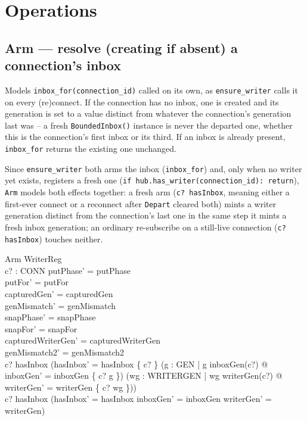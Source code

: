 \documentclass[a4paper,10pt,fleqn]{article}
\begin{document}
\section{Operations}

\subsection{Arm --- resolve (creating if absent) a connection's inbox}

Models \texttt{inbox\_for(connection\_id)} called on its own, as
\texttt{ensure\_writer} calls it on every (re)connect. If the connection has
no inbox, one is created and its generation is set to a value distinct from
whatever the connection's generation last was -- a fresh
\texttt{BoundedInbox()} instance is never the departed one, whether this is
the connection's first inbox or its third. If an inbox is already present,
\texttt{inbox\_for} returns the existing one unchanged.

Since \texttt{ensure\_writer} both arms the inbox (\texttt{inbox\_for}) and,
only when no writer yet exists, registers a fresh one
(\texttt{if hub.has\_writer(connection\_id): return}), \texttt{Arm} models
both effects together: a fresh arm (\texttt{c? \notin hasInbox}, meaning
either a first-ever connect or a reconnect after \texttt{Depart} cleared
both) mints a writer generation distinct from the connection's last one in
the same step it mints a fresh inbox generation; an ordinary re-subscribe on
a still-live connection (\texttt{c? \in hasInbox}) touches neither.

\begin{schema}{Arm}
  \Delta WriterReg \\
  c? : CONN
\where
  putPhase' = putPhase \\
  putFor' = putFor \\
  capturedGen' = capturedGen \\
  genMismatch' = genMismatch \\
  snapPhase' = snapPhase \\
  snapFor' = snapFor \\
  capturedWriterGen' = capturedWriterGen \\
  genMismatch2' = genMismatch2 \\
  c? \notin hasInbox \implies
    (hasInbox' = hasInbox \cup \{ c? \} \land
     (\exists g : GEN | g \neq inboxGen(c?) @
       inboxGen' = inboxGen \oplus \{ c? \mapsto g \}) \land
     (\exists wg : WRITERGEN | wg \neq writerGen(c?) @
       writerGen' = writerGen \oplus \{ c? \mapsto wg \})) \\
  c? \in hasInbox \implies
    (hasInbox' = hasInbox \land inboxGen' = inboxGen \land writerGen' = writerGen)
\end{schema}
\end{document}
